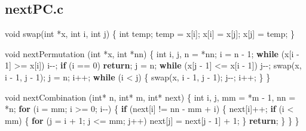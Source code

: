 \documentclass[
  12pt,
]{book}
\newenvironment{Shaded}{\begin{snugshade}}{\end{snugshade}}
\newcommand{\ControlFlowTok}[1]{\textcolor[rgb]{0.13,0.29,0.53}{\textbf{#1}}}
\newcommand{\DataTypeTok}[1]{\textcolor[rgb]{0.13,0.29,0.53}{#1}}
\newcommand{\DecValTok}[1]{\textcolor[rgb]{0.00,0.00,0.81}{#1}}
\newcommand{\NormalTok}[1]{#1}
\theoremstyle{definition}
\theoremstyle{definition}
\theoremstyle{definition}
\theoremstyle{definition}
\theoremstyle{remark}
\begin{document}
\hypertarget{nextpc.c}{%
\subsection{nextPC.c}\label{nextpc.c}}

\begin{Shaded}
\begin{Highlighting}[]

\DataTypeTok{void}
\NormalTok{swap(}\DataTypeTok{int}\NormalTok{ *x, }\DataTypeTok{int}\NormalTok{ i, }\DataTypeTok{int}\NormalTok{ j)}
\NormalTok{\{}
  \DataTypeTok{int}\NormalTok{           temp;}
\NormalTok{  temp = x[i];}
\NormalTok{  x[i] = x[j];}
\NormalTok{  x[j] = temp;}
\NormalTok{\}}


\DataTypeTok{void}
\NormalTok{nextPermutation (}\DataTypeTok{int}\NormalTok{ *x, }\DataTypeTok{int}\NormalTok{ *nn)}
\NormalTok{\{}
  \DataTypeTok{int}\NormalTok{             i, j, n = *nn;}
\NormalTok{  i = n {-} }\DecValTok{1}\NormalTok{;}
  \ControlFlowTok{while}\NormalTok{ (x[i {-} }\DecValTok{1}\NormalTok{] \textgreater{}= x[i])}
\NormalTok{    i{-}{-};}
  \ControlFlowTok{if}\NormalTok{ (i == }\DecValTok{0}\NormalTok{)}
    \ControlFlowTok{return}\NormalTok{;}
\NormalTok{  j = n;}
  \ControlFlowTok{while}\NormalTok{ (x[j {-} }\DecValTok{1}\NormalTok{] \textless{}= x[i {-} }\DecValTok{1}\NormalTok{])}
\NormalTok{    j{-}{-};}
\NormalTok{  swap(x, i {-} }\DecValTok{1}\NormalTok{, j {-} }\DecValTok{1}\NormalTok{);}
\NormalTok{  j = n;}
\NormalTok{  i++;}
  \ControlFlowTok{while}\NormalTok{ (i \textless{} j) \{}
\NormalTok{    swap(x, i {-} }\DecValTok{1}\NormalTok{, j {-} }\DecValTok{1}\NormalTok{);}
\NormalTok{    j{-}{-};}
\NormalTok{    i++;}
\NormalTok{  \}}
\NormalTok{\}}

\DataTypeTok{void}\NormalTok{ nextCombination (}\DataTypeTok{int}\NormalTok{* n, }\DataTypeTok{int}\NormalTok{* m, }\DataTypeTok{int}\NormalTok{* next) \{}
  \DataTypeTok{int}\NormalTok{ i, j, mm = *m {-} }\DecValTok{1}\NormalTok{, nn = *n;}
  \ControlFlowTok{for}\NormalTok{ (i = mm; i  \textgreater{}= }\DecValTok{0}\NormalTok{; i{-}{-}) \{}
    \ControlFlowTok{if}\NormalTok{ (next[i] != nn {-} mm + i) \{}
\NormalTok{      next[i]++;}
      \ControlFlowTok{if}\NormalTok{ (i \textless{} mm) \{}
        \ControlFlowTok{for}\NormalTok{ (j = i + }\DecValTok{1}\NormalTok{; j \textless{}= mm; j++)}
\NormalTok{          next[j] = next[j {-} }\DecValTok{1}\NormalTok{] + }\DecValTok{1}\NormalTok{;}
\NormalTok{      \}}
      \ControlFlowTok{return}\NormalTok{;}
\NormalTok{    \}}
\NormalTok{  \}}
\NormalTok{\}}
\end{Highlighting}
\end{Shaded}
\end{document}

